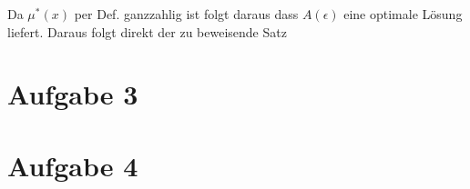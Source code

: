\documentclass[a4paper,10pt,oneside,reqno]{scrartcl}
\begin{document}
Da $\mu^*(x)$ per Def. ganzzahlig ist folgt daraus dass $A(\epsilon)$ eine optimale Lösung liefert. Daraus folgt direkt der zu beweisende Satz
\section*{Aufgabe 3}%

\section*{Aufgabe 4}%
\end{document}
